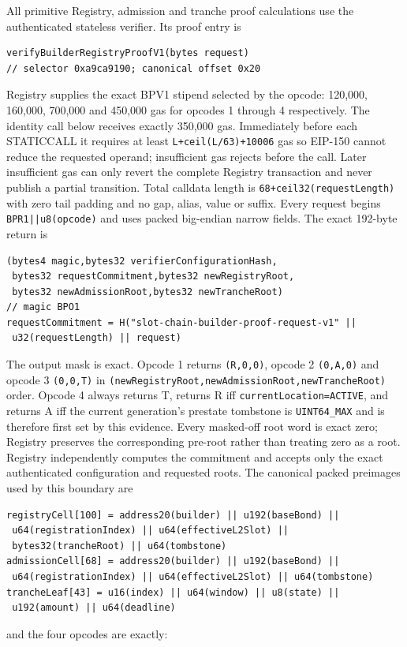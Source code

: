 \documentclass[a4paper,11pt]{article}
\newcommand{\code}[1]{\nolinkurl{#1}}
\begin{document}
All primitive Registry, admission and tranche proof calculations use the
authenticated stateless verifier.  Its proof entry is
\begin{verbatim}
verifyBuilderRegistryProofV1(bytes request)
// selector 0xa9ca9190; canonical offset 0x20
\end{verbatim}
Registry supplies the exact BPV1 stipend selected by the opcode: 120,000,
160,000, 700,000 and 450,000 gas for opcodes 1 through 4 respectively.
The identity call below receives exactly 350,000 gas.  Immediately before
each STATICCALL it requires at least
\code{L+ceil(L/63)+10006} gas so EIP-150 cannot reduce the requested
operand; insufficient gas rejects before the call.  Later insufficient gas
can only revert the complete Registry transaction and never publish a partial
transition.
Total calldata length is \code{68+ceil32(requestLength)} with zero tail
padding and no gap, alias, value or suffix.  Every request begins
\code{BPR1||u8(opcode)} and uses packed big-endian narrow fields.  The exact
192-byte return is
\begin{verbatim}
(bytes4 magic,bytes32 verifierConfigurationHash,
 bytes32 requestCommitment,bytes32 newRegistryRoot,
 bytes32 newAdmissionRoot,bytes32 newTrancheRoot)
// magic BPO1
requestCommitment = H("slot-chain-builder-proof-request-v1" ||
 u32(requestLength) || request)
\end{verbatim}
The output mask is exact.  Opcode 1 returns \code{(R,0,0)}, opcode 2
\code{(0,A,0)} and opcode 3 \code{(0,0,T)} in
\code{(newRegistryRoot,newAdmissionRoot,newTrancheRoot)} order.  Opcode 4
always returns T, returns R iff \code{currentLocation=ACTIVE}, and returns A
iff the current generation's prestate tombstone is \code{UINT64_MAX} and is
therefore first set by this evidence.  Every masked-off root word is exact
zero; Registry preserves the corresponding pre-root rather than treating zero
as a root.  Registry independently computes the commitment and
accepts only the exact authenticated configuration and requested roots.
The canonical packed preimages used by this boundary are
\begin{verbatim}
registryCell[100] = address20(builder) || u192(baseBond) ||
 u64(registrationIndex) || u64(effectiveL2Slot) ||
 bytes32(trancheRoot) || u64(tombstone)
admissionCell[68] = address20(builder) || u192(baseBond) ||
 u64(registrationIndex) || u64(effectiveL2Slot) || u64(tombstone)
trancheLeaf[43] = u16(index) || u64(window) || u8(state) ||
 u192(amount) || u64(deadline)
\end{verbatim}
and the four opcodes are exactly:
\end{document}
